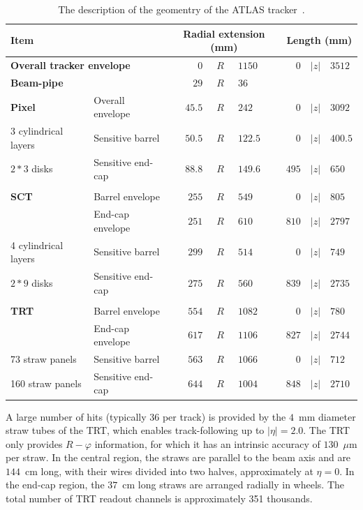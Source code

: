 \begin{table}
\centering
\begin{tabular}{ll | r@{$<$}c@{$<$}l | r@{$<$}c@{$<$}l} \hline\hline
\multicolumn{2}{l|}{\bf Item} & \multicolumn{3}{c|}{\bf Radial extension (mm)} & \multicolumn{3}{c}{\bf Length (mm)} \\\hline
\multicolumn{2}{l|}{\bf Overall tracker envelope} & $0$&$R$&$1150$ & $0$&$|z|$&$3512$ \\
\multicolumn{2}{l|}{\bf Beam-pipe} & $29$&$R$&$36$ & \multicolumn{3}{c}{}\\\hline
{\bf Pixel} & Overall envelope & \hspace{1cm} $45.5$&$R$&$242$ & $0$&$|z|$&$3092$ \\
3 cylindrical layers & Sensitive barrel & $50.5$&$R$&$122.5$ & $0$&$|z|$&$400.5$ \\
$2*3$ disks & Sensitive end-cap & $88.8$&$R$&$149.6$ & $495$&$|z|$&$650$ \\
\multicolumn{2}{l|}{} & \multicolumn{3}{c|}{} & \multicolumn{3}{c}{}\\
{\bf SCT} & Barrel envelope & $255$&$R$&$549$ & $0$&$|z|$&$805$ \\
 & End-cap envelope & $251$&$R$&$610$ & $810$&$|z|$&$2797$ \\
4 cylindrical layers & Sensitive barrel & $299$&$R$&$514$ & $0$&$|z|$&$749$ \\
$2*9$ disks & Sensitive end-cap & $275$&$R$&$560$ & $839$&$|z|$&$2735$ \\
\multicolumn{2}{l|}{} & \multicolumn{3}{c|}{} & \multicolumn{3}{c}{}\\
{\bf TRT} & Barrel envelope & $554$&$R$&$1082$ & $0$&$|z|$&$780$ \\
 & End-cap envelope & $617$&$R$&$1106$ & $827$&$|z|$&$2744$ \\
73 straw panels & Sensitive barrel & $563$&$R$&$1066$ & $0$&$|z|$&$712$ \\
160 straw panels & Sensitive end-cap & $644$&$R$&$1004$ & $848$&$|z|$&$2710$ \\
\hline\hline
\end{tabular}
\caption{The description of the geomentry of the ATLAS tracker~\cite{lib:ATLASdet}.}
\label{tab:ATLAS_tracker}
\end{table}

A large number of hits (typically 36 per track) is provided by the $4$~mm diameter straw tubes
of the TRT, which enables track-following up to $|\eta|=2.0$. The TRT only provides $R-\varphi$ information, for which it has an intrinsic accuracy of $130$~$\mu$m per straw. In the central region, the straws are
parallel to the beam axis and are $144$~cm long, with their wires divided into two halves, approximately at $\eta = 0$. In the end-cap region, the $37$~cm long straws are arranged radially in wheels. The
total number of TRT readout channels is approximately 351 thousands.

